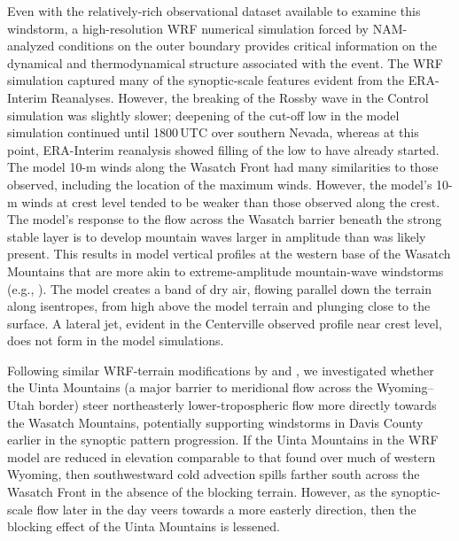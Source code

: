 \documentclass[pdftex,12pt]{article}
\begin{document}
Even with the relatively-rich observational dataset available to examine this windstorm, a high-resolution WRF numerical simulation forced by NAM-analyzed conditions on the outer boundary provides critical information on the dynamical and thermodynamical structure associated with the event. The WRF simulation captured many of the synoptic-scale features evident from the ERA-Interim Reanalyses. However, the breaking of the Rossby wave in the Control simulation was slightly slower; deepening of the cut-off low in the model simulation continued until 1800\,UTC over southern Nevada, whereas at this point, ERA-Interim reanalysis showed filling of the low to have already started. The model 10-m winds along the Wasatch Front had many similarities to those observed, including the location of the maximum winds. However, the model's 10-m winds at crest level tended to be weaker than those observed along the crest. The model's response to the flow across the Wasatch barrier beneath the strong stable layer is to develop mountain waves larger in amplitude than was likely present. This results in model vertical profiles at the western base of the Wasatch Mountains that are more akin to extreme-amplitude mountain-wave windstorms (e.g., \citealt{Grubisic2008}). The  model creates a band of dry air, flowing parallel down the terrain along isentropes, from high above the model terrain and plunging close to the surface. A lateral jet,  evident in the Centerville observed profile near crest level, does not form in the model simulations.

Following similar WRF-terrain modifications by \citet{West2011} and \citet{Alcott2013}, we investigated whether the Uinta Mountains (a major barrier to meridional flow across the Wyoming--Utah border) steer northeasterly lower-tropospheric flow more directly towards the Wasatch Mountains, potentially supporting windstorms in Davis County earlier in the synoptic pattern progression. If the Uinta Mountains in the WRF model are reduced in elevation comparable to that found over much of western Wyoming, then southwestward cold advection spills farther south across the Wasatch Front  in the absence of the blocking terrain. However, as the synoptic-scale flow later in the day veers towards a more easterly direction, then the blocking effect of the Uinta Mountains is lessened.
\end{document}
